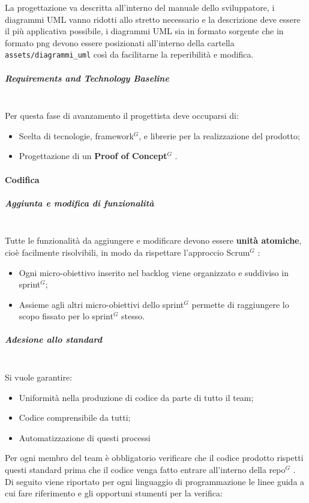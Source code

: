 \noindent
La progettazione va descritta all'interno del manuale dello sviluppatore, i
diagrammi UML vanno ridotti allo stretto necessario e la descrizione deve essere
il più applicativa possibile, i diagrammi UML sia in formato sorgente che in
formato png devono essere posizionati all'interno della cartella
\texttt{assets/diagrammi\_uml} così da facilitarne la reperibilità e modifica.

\subparagraph{Requirements and Technology Baseline}
\mbox{} \\
Per questa fase di avanzamento il progettista deve occuparsi di:
\begin{itemize}
    \item Scelta di tecnologie, framework$^G$, e librerie per la realizzazione del prodotto;
    \item Progettazione di un \textbf{Proof of Concept}$^G$ .
\end{itemize}

\paragraph{Codifica}

\subparagraph{Aggiunta e modifica di funzionalità}
\mbox{}\\
Tutte le funzionalità da aggiungere e modificare devono essere \textbf{unità atomiche}, cioè facilmente risolvibili, in modo da rispettare
l'approccio Scrum$^G$ :
\begin{itemize}
    \item Ogni micro-obiettivo inserito nel backlog viene organizzato e suddiviso in sprint$^G$;
    \item Assieme agli altri micro-obiettivi dello sprint$^G$ permette di raggiungere lo scopo fissato per lo sprint$^G$ stesso.
\end{itemize}

\subparagraph{Adesione allo standard}
\mbox{}\\
Si vuole garantire:
\begin{itemize}
    \item Uniformità nella produzione di codice da parte di tutto il team;
    \item Codice comprensibile da tutti;
    \item Automatizzazione di questi processi
\end{itemize}
Per ogni membro del team è obbligatorio verificare che il codice prodotto rispetti questi standard prima che il codice
venga fatto entrare all'interno della repo$^G$ .\\
Di seguito viene riportato per ogni linguaggio di programmazione le linee guida a cui fare riferimento e gli opportuni
stumenti per la verifica:

